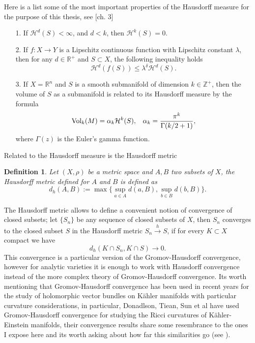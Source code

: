 \documentclass[12pt,twoside,a4paper]{report}
\newtheorem{definition}{Definition}[section]
\newcommand{\zah}{\ensuremath{ \mathbb Z }}
\newcommand{\re}{\ensuremath{\mathbb R }}
\begin{document}
Here is a list some of the most important properties of the Hausdorff measure for the purpose of this thesis, see \cite{Stolzenberg}[ch. 3]

\begin{enumerate}
        \item[1.] If $\mathcal{H}^d(S)<\infty$, and $d<k$, then $\mathcal{H}^k(S)=0$.\\

        \item[2.] If $f:X\rightarrow Y$ is a Lipschitz continuous function with
        Lipschitz constant $\lambda$, then for any $d\in\re^{+}$ and
        $S\subset X$, the following inequality holds
        \[
        \mathcal{H}^d(f(S))\leq\lambda^{\delta}\mathcal{H}^d(S).
        \]
        \item[3.]If $X=\re^{n}$ and $S$ is a smooth submanifold of dimension
        $k\in\zah^{+}$, then the volume of $S$ as a submanifold is related to
        its Hausdorff measure by the formula
        \[
        \textrm{Vol}_{k}(M)=\alpha_{k}\mathcal{H}^k(S),\hspace*{0.3cm}\alpha_k= \frac{\pi^k}{\Gamma(k/2+1)},
        \]
\noindent where $\Gamma(z)$ is the Euler's gamma function.
\end{enumerate}
Related to the Hausdorff measure is the Hausdorff metric
\begin{definition}
Let $(X,\rho)$ be a metric space and $A,B$ two subsets of $X$, the Hausdorff metric defined for $A$
and $B$ is defined as 
\[
d_h(A,B):= \max\Big\{\sup_{a\in A}d(a,B),\sup_{b\in B}d(b,B)\Big\}.
\]
\end{definition}
The Hausdorff metric allows to define a convenient notion of convergence of closed subsets; let $\{S_n \}$ be any sequence of closed subsets of $X$, then $S_n$ converges to the closed subset $S$ in the Hausdorff metric $S_n\overset{h}\rightarrow S$, if for every $K\subset X$ compact we have
\[
  d_h(K\cap S_n,K\cap S)\rightarrow 0. 
\]
\noindent This convergence is a particular version of the Gromov-Hausdorff convergence, however for analytic varieties it is enough to work with Hausdorff convergence instead of the more complex theory of Gromov-Hausdorff convergence. Its worth mentioning that Gromov-Hausdorff convergence has been used in recent years for the study of holomorphic vector bundles on Kähler manifolds with particular curvature considerations, in particular, Donadlson, Tiean, Sun et al have used Gromov-Hausdorff convergence for studying the Ricci curvatures of Kähler-Einstein manifolds, their convergence results share some resembrance to the ones I expose here and its worth asking about how far this similarities go (see \cite{Donadlson-Sun} \cite{tian}). 
\end{document}
